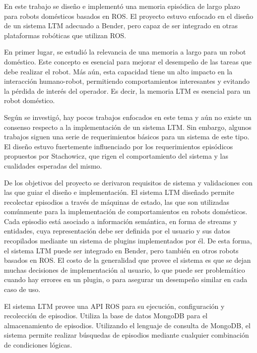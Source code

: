 \begin{conclusion}

En este trabajo se diseño e implementó una memoria episódica de largo plazo para robots domésticos basados en ROS. El proyecto estuvo enfocado en el diseño de un sistema LTM adecuado a Bender, pero capaz de ser integrado en otras plataformas robóticas que utilizan ROS.

En primer lugar, se estudió la relevancia de una memoria a largo para un robot doméstico. Este concepto es esencial para mejorar el desempeño de las tareas que debe realizar el robot. Más aún, esta capacidad tiene un alto impacto en la interacción humano-robot, permitiendo comportamientos interesantes y evitando la pérdida de interés del operador. Es decir, la memoria LTM es esencial para un robot doméstico.

Según se investigó, hay pocos trabajos enfocados en este tema y aún no existe un consenso respecto a la implementación de un sistema LTM. Sin embargo, algunos trabajos siguen una serie de requerimientos básicos para un sistema de este tipo. El diseño estuvo fuertemente influenciado por los requerimientos episódicos propuestos por Stachowicz, que rigen el comportamiento del sistema y las cualidades esperadas del mismo.

De los objetivos del proyecto se derivaron requisitos de sistema y validaciones con las que guiar el diseño e implementación. El sistema LTM diseñado permite recolectar episodios a través de máquinas de estado, las que son utilizadas comúnmente para la implementación de comportamientos en robots domésticos. Cada episodio está asociado a información semántica, en forma de streams y entidades, cuya representación debe ser definida por el usuario y sus datos recopilados mediante un sistema de plugins implementados por él. De esta forma, el sistema LTM puede ser integrado en Bender, pero también en otros robots basados en ROS. El costo de la generalidad que provee el sistema es que se dejan muchas decisiones de implementación al usuario, lo que puede ser problemático cuando hay errores en un plugin, o para asegurar un desempeño similar en cada caso de uso.

El sistema LTM provee una API ROS para su ejecución, configuración y recolección de episodios. Utiliza la base de datos MongoDB para el almacenamiento de episodios. Utilizando el lenguaje de consulta de MongoDB, el sistema permite realizar búsquedas de episodios mediante cualquier combinación de condiciones lógicas.



\end{conclusion}
